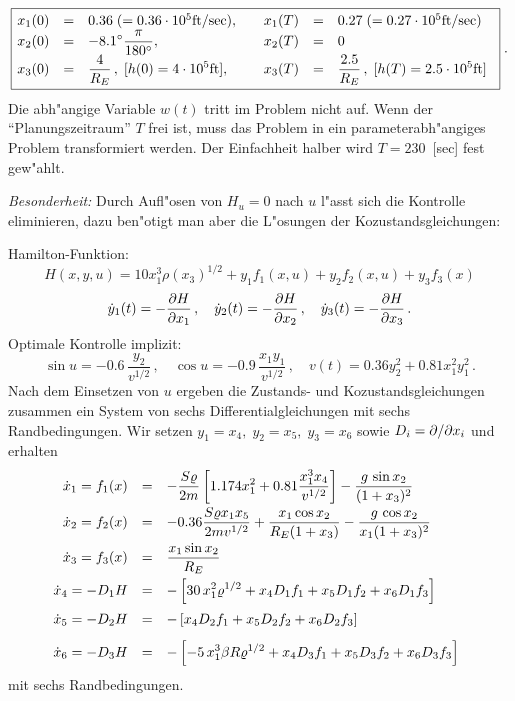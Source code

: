 \documentclass[12pt,a4paper,twoside,leqno]{article}
\begin{document}
\[
\fbox{$
\ba{.}{llllll}
x_1(0) &=& 0.36  \; ( = 0.36\cdot 10^5  \text{ft/sec}), \quad
&
x_1(T) &=& 0.27 \; ( = 0.27\cdot 10^5  \text{ft/sec})\\
%
x_2(0) &=& \dis - 8.1^{\circ}\frac{\pi}{180^{\circ}}, \quad
&
x_2(T) &=&  0\\
%
x_3(0) &=& \dis \frac{4}{R_E}\,, \; [h(0) = 4\cdot 10^5  \text{ft}], \quad
&
x_3(T) &=& \dis \frac{2.5}{R_E}\,, \; [h(T) = 2.5 \cdot 10^5  \text{ft}]
\ea{.}
$}\;.
\]
%
Die abh"angige Variable $w(t)$ tritt im Problem nicht auf.
Wenn der ``Planungszeitraum'' $T$ frei ist, muss das Problem in ein
parameterabh"angiges Problem transformiert werden. Der Einfachheit halber
wird $T = 230$\  [sec] fest gew"ahlt.
\par
{\em Besonderheit:}
Durch Aufl"osen von $H_u = 0$ nach $u$ l"asst sich die Kontrolle eliminieren,
dazu ben"otigt man aber die L"osungen der Kozustandsgleichungen:
\par
{\sc Hamilton}-Funktion:
\[
H(x,y,u) = 10x^3_1\rho(x_3)^{1/2} + y_1f_1(x,u) + y_2f_2(x,u) + y_3f_3(x)
\]
\[
\dot{y}_1(t) = - \frac{\partial H}{\partial x_1}\,,\quad
\dot{y}_2(t) = - \frac{\partial H}{\partial x_2}\,, \quad
\dot{y}_3(t) = - \frac{\partial H}{\partial x_3}\,.
\]
Optimale Kontrolle implizit:
\[
\sin u = - 0.6 \,\frac{y_2}{v^{1/2}}\,,
\quad
\cos u = - 0.9\, \frac{x_1 y_1}{v^{1/2}}\,,
\quad
v(t) = 0.36 y_2^2 + 0.81x_1^2y_1^2\,.
\]
%
Nach dem Einsetzen von $u$ ergeben die Zustands- und
Kozustandsgleichungen zusammen ein System von sechs Differentialgleichungen
mit sechs Randbedingungen. Wir setzen $y_1 = x_4, \; y_2 = x_5, \; y_3 = x_6$
sowie $D_i = \partial/\partial x_i$ und erhalten
\[
\ba{.}{rcl}
\dot{x}_1 = f_1(x) &=&
\dis  - \frac{S\rho}{2 m}
        \left[1.174x_1^2 + 0.81 \frac{x_1^3x_4}{v^{1/2}}\right]
     - \frac{g \, \sin x_2}{(1 + x_3)^2}\\[2ex]
%
\dot{x}_2 = f_2(x) &=&
\dis - 0.36 \frac{S \rho x_1x_5}{2 m v^{1/2}}
+ \frac{x_1 \cos x_2}{R_E(1 + x_3)}
- \frac{g \, \cos x_2}{x_1(1 + x_3)^2}\\[2ex]
%
\dot{x}_3 = f_3(x)&=&
\dis \frac{x_1 \sin x_2}{R_E}\\[2ex]
%
\dot{x}_4 = - D_1H &=& \dis
- \left[30\, x^2_1\rho^{1/2} + x_4D_1f_1 + x_5 D_1f_2 + x_6D_1f_3\right]
\\[2ex]
%
\dot{x}_5 = - D_2H &=& \dis
- \left[x_4D_2f_1 + x_5D_2f_2 + x_6D_2f_3\right]
\\[2ex]
%
\dot{x}_6 = - D_3H &=& \dis
- \left[-5\, x^3_1 \beta R \rho^{1/2}
+ x_4 D_3f_1 + x_5D_3f_2 + x_6D_3f_3\right]
\ea{.}
\]
mit sechs Randbedingungen.
\par
\end{document}
